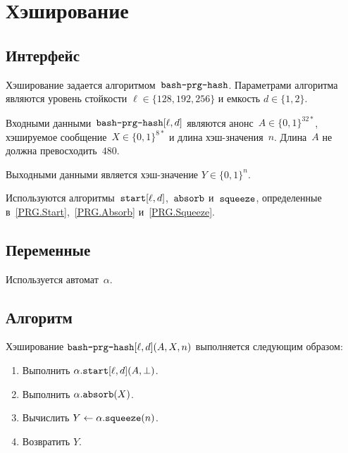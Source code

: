 \section{Хэширование}\label{PRG.Hash}

\subsection{Интерфейс}\label{PRG.Hash.IFace}

Хэширование задается алгоритмом~$\texttt{bash-prg-hash}$.
Параметрами алгоритма являются уровень стойкости $\ell\in\{128,192,256\}$
и емкость $d\in\{1,2\}$. 

Входными данными~$\texttt{bash-prg-hash}[\ell, d]$ являются 
анонс~$A\in\{0,1\}^{32*}$, хэшируемое сообщение~$X\in\{0,1\}^{8*}$ 
и длина хэш-значения~$n$. Длина~$A$ не должна превосходить~$480$.

Выходными данными является хэш-значение $Y\in\{0,1\}^n$.

Используются алгоритмы~$\texttt{start}[\ell,d]$,~$\texttt{absorb}$ и~$\texttt{squeeze}$,
определенные в~\ref{PRG.Start},~\ref{PRG.Absorb} и~\ref{PRG.Squeeze}.

\subsection{Переменные}\label{PRG.Hash.Vars}

Используется автомат~$\alpha$.

\subsection{Алгоритм}\label{PRG.Hash.Alg}

Хэширование $\texttt{bash-prg-hash}[\ell,d](A,X,n)$ выполняется следующим 
образом:
\begin{enumerate}
\item
Выполнить $\alpha.\texttt{start}[\ell,d](A,\perp)$.
\item
Выполнить $\alpha.\texttt{absorb}(X)$.
\item
Вычислить $Y\leftarrow \alpha.\texttt{squeeze}(n)$.
\item
Возвратить $Y$.
\end{enumerate}
